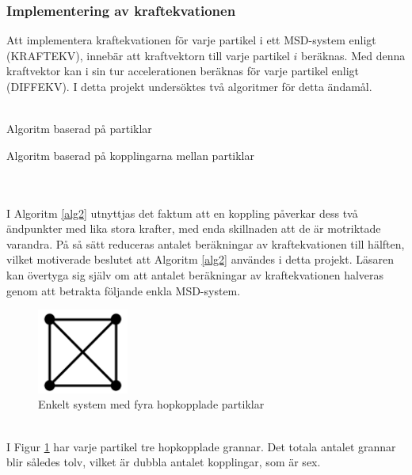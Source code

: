 \documentclass[a4paper,12pt,oneside,final,swedish]{extarticle}
\begin{document}
\subsubsection{Implementering av kraftekvationen}
Att implementera kraftekvationen för varje partikel i ett MSD-system enligt (KRAFTEKV), innebär att kraftvektorn till varje partikel $i$ beräknas. Med denna kraftvektor kan i sin tur accelerationen beräknas för varje partikel enligt (DIFFEKV). I detta projekt undersöktes två algoritmer för detta ändamål.\\\\
\begin{algorithm}[H]
\caption{Algoritm baserad på partiklar\label{alg2}}
\end{algorithm}
\begin{algorithm}[H]
\caption{Algoritm baserad på kopplingarna mellan partiklar\label{alg3}}
\end{algorithm}
\noindent \\\\I Algoritm \ref{alg2} utnyttjas det faktum att en koppling påverkar dess två ändpunkter med lika stora krafter, med enda skillnaden att de är motriktade varandra. På så sätt reduceras antalet beräkningar av kraftekvationen till hälften, vilket motiverade beslutet att Algoritm \ref{alg2} användes i detta projekt. Läsaren kan övertyga sig själv om att antalet beräkningar av kraftekvationen halveras genom att betrakta följande enkla MSD-system.
\begin{figure}[h!]
  \begin{center}
    \includegraphics[width=3cm]{Bilder/2D_2x2.png} 
  \end{center}
  \caption{Enkelt system med fyra hopkopplade partiklar}
  \label{enkelfyra}
\end{figure}
\\I Figur \ref{enkelfyra} har varje partikel tre hopkopplade grannar. Det totala antalet grannar blir således tolv, vilket är dubbla antalet kopplingar, som är sex.
\end{document}
